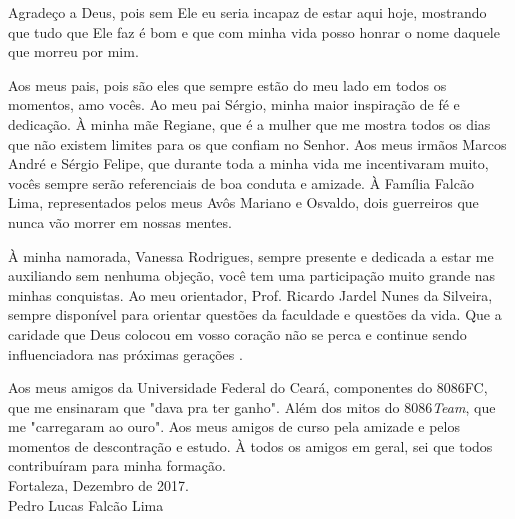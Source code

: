\begin{agradecimentos}[AGRADECIMENTOS]
	Agradeço  a Deus, pois sem Ele eu seria incapaz de estar aqui hoje,
mostrando que  tudo que Ele faz é bom e que com minha vida posso honrar o nome daquele que morreu por mim.

Aos meus pais, pois são eles que sempre estão do meu lado em todos os momentos, amo vocês. Ao meu pai Sérgio, minha maior inspiração de fé e dedicação. À minha mãe Regiane, que é a mulher que me mostra todos os dias que não existem limites para os que confiam no Senhor. Aos meus irmãos Marcos André e Sérgio Felipe, que durante toda a minha vida me incentivaram muito, vocês sempre serão  referenciais de boa conduta e amizade. À Família Falcão Lima, representados pelos meus Avôs Mariano e Osvaldo, dois guerreiros que nunca vão morrer em nossas mentes.

À minha namorada, Vanessa Rodrigues, sempre presente e dedicada a estar me  auxiliando sem nenhuma objeção, você tem uma participação muito grande nas minhas conquistas.  
Ao meu orientador, Prof. Ricardo Jardel Nunes da Silveira, sempre disponível para orientar questões da faculdade e questões da vida. Que a caridade que Deus colocou em vosso coração não se perca e continue sendo influenciadora nas próximas gerações .


Aos meus amigos da Universidade Federal do Ceará, componentes do 8086FC, que me ensinaram que "dava pra ter ganho". Além dos mitos do 8086\textit{Team}, que me "carregaram ao ouro". Aos meus amigos de curso pela amizade e pelos momentos de descontração e estudo. À todos os amigos em geral, sei que todos contribuíram para minha formação.\\

Fortaleza, Dezembro de 2017.\\

Pedro Lucas Falcão Lima\\
\end{agradecimentos}
